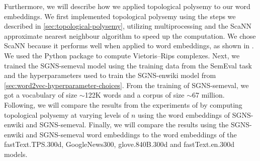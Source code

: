 Furthermore, we will describe how we applied topological polysemy to our word embeddings. We first implemented topological polysemy using the steps we described in \cref{sec:topological-polysemy}, utilizing multiprocessing and the ScaNN \cite{scann2020} approximate nearest neighbour algorithm to speed up the computation. We chose ScaNN because it performs well when applied to word embeddings, as shown in \cite{AnnBenchmarks2021}. We used the  \cite{ctralie2018ripser} Python package to compute Vietoris–Rips complexes. Next, we trained the SGNS-semeval model using the training data from the SemEval task and the hyperparameters used to train the SGNS-enwiki model from \cref{sec:word2vec-hyperparameter-choices}. From the training of SGNS-semeval, we got a vocabulary of size $\sim$122K words and a corpus of size $\sim$67 million. Following, we will compare the results from the experiments of \cite{jakubowski2020topology} by computing topological polysemy at varying levels of $n$ using the word embeddings of SGNS-enwiki and SGNS-semeval. Finally, we will compare the results using the SGNS-enwiki and SGNS-semeval word embeddings to the word embeddings of the fastText.TPS.300d, GoogleNews300, glove.840B.300d and fastText.en.300d models.

